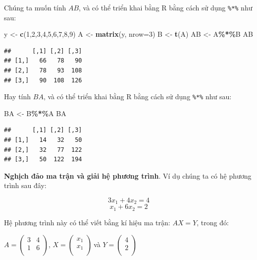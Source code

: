\documentclass[
]{book}
\newenvironment{Shaded}{\begin{snugshade}}{\end{snugshade}}
\newcommand{\DataTypeTok}[1]{\textcolor[rgb]{0.13,0.29,0.53}{#1}}
\newcommand{\DecValTok}[1]{\textcolor[rgb]{0.00,0.00,0.81}{#1}}
\newcommand{\KeywordTok}[1]{\textcolor[rgb]{0.13,0.29,0.53}{\textbf{#1}}}
\newcommand{\NormalTok}[1]{#1}
\newcommand{\OperatorTok}[1]{\textcolor[rgb]{0.81,0.36,0.00}{\textbf{#1}}}
\newcommand{\StringTok}[1]{\textcolor[rgb]{0.31,0.60,0.02}{#1}}
\begin{document}
Chúng ta muốn tính \(AB\), và có thể triển khai bằng R bằng cách sử dụng \texttt{\%*\%} như sau:

\begin{Shaded}
\begin{Highlighting}[]
\NormalTok{y \textless{}{-}}\StringTok{ }\KeywordTok{c}\NormalTok{(}\DecValTok{1}\NormalTok{,}\DecValTok{2}\NormalTok{,}\DecValTok{3}\NormalTok{,}\DecValTok{4}\NormalTok{,}\DecValTok{5}\NormalTok{,}\DecValTok{6}\NormalTok{,}\DecValTok{7}\NormalTok{,}\DecValTok{8}\NormalTok{,}\DecValTok{9}\NormalTok{)}
\NormalTok{A \textless{}{-}}\StringTok{ }\KeywordTok{matrix}\NormalTok{(y, }\DataTypeTok{nrow=}\DecValTok{3}\NormalTok{)}
\NormalTok{B \textless{}{-}}\StringTok{ }\KeywordTok{t}\NormalTok{(A)}
\NormalTok{AB \textless{}{-}}\StringTok{ }\NormalTok{A}\OperatorTok{\%*\%}\NormalTok{B}
\NormalTok{AB}
\end{Highlighting}
\end{Shaded}

\begin{verbatim}
##      [,1] [,2] [,3]
## [1,]   66   78   90
## [2,]   78   93  108
## [3,]   90  108  126
\end{verbatim}

Hay tính \(BA\), và có thể triển khai bằng R bằng cách sử dụng \texttt{\%*\%} như sau:

\begin{Shaded}
\begin{Highlighting}[]
\NormalTok{BA \textless{}{-}}\StringTok{ }\NormalTok{B}\OperatorTok{\%*\%}\NormalTok{A}
\NormalTok{BA}
\end{Highlighting}
\end{Shaded}

\begin{verbatim}
##      [,1] [,2] [,3]
## [1,]   14   32   50
## [2,]   32   77  122
## [3,]   50  122  194
\end{verbatim}

\textbf{Nghịch đảo ma trận và giải hệ phương trình}. Ví dụ chúng ta có hệ phương trình sau đây:

\[3x_{1} + 4x_{2} = 4\]
\[x_{1} + 6x_{2} = 2\]

Hệ phương trình này có thể viết bằng kí hiệu ma trận: \(AX = Y\), trong đó:

\(A = \begin{pmatrix} 3 & 4 \\ 1 & 6 \\ \end{pmatrix}\), \(X = \begin{pmatrix} x_{1} \\ x_{1} \\ \end{pmatrix}\ \)và \(Y = \begin{pmatrix} 4 \\ 2 \\ \end{pmatrix}\)
\end{document}
